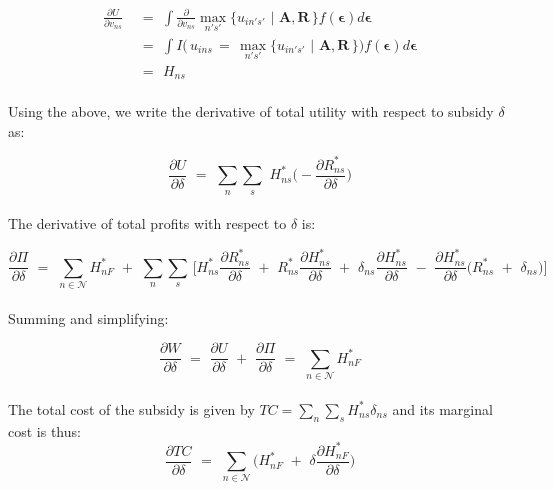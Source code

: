 \documentclass[12pt]{article}
\begin{document}
\begin{equation*}
\begin{aligned}
\frac{\partial U}{\partial v_{ns}} \,\, & =\,\, \int \frac{\partial }{\partial v_{ns}} \max_{n's'}\{u_{in' s'}\,\,|\,\, \bm{A},\bm{R}\,\}f(\bm{\epsilon}) d\bm{\epsilon} \\[.6em]
\,\, & =\,\, \int I\Big( \, u_{ins} \,=\, \max_{n's'}\{u_{in' s'} \,\,|\,\, \bm{A},\bm{R}\,\} \Big)f(\bm{\epsilon}) d\bm{\epsilon} \\[.6em]
\,\, & =\,\  H_{ns}
\end{aligned}
\end{equation*} \\[-1.99em]

 Using the above, we write the derivative of total utility with respect to subsidy $\delta$ as:

\begin{equation*}
\frac{\partial U}{\partial\delta} \,\,=\,\,  \sum_{n}\sum_{s}\,\, H^*_{ns}\Big(-\frac{\partial R_{ns}^*}{\partial \delta}\Big) 
\end{equation*} \\[-1.99em]

 The derivative of total profits with respect to $\delta$ is:

\begin{equation*}
\frac{\partial \Pi}{\partial\delta} \,\,=\,\, \sum_{n\in\mathcal{N}} H^*_{nF} \,\,+\,\, \sum_{n}\sum_{s}\, \Big[ H^*_{ns}\frac{\partial R^*_{ns}}{\partial \delta} \,\,+\,\, R^*_{ns}\frac{\partial H^*_{ns}}{\partial \delta} \,\,+\,\, \delta_{ns}\frac{\partial H^*_{ns}}{\partial \delta} \,\,-\,\, \frac{\partial H^*_{ns}}{\partial \delta}\big( R^*_{ns} \,\, + \,\, \delta_{ns} \big) \Big]
\end{equation*} \\[-1.99em]

 Summing and simplifying:

\begin{equation}
\frac{\partial W}{\partial\delta} \,\,=\,\, \frac{\partial U}{\partial\delta} \,\,+\,\, \frac{\partial \Pi}{\partial\delta} \,\,=\,\, \sum_{n\in\mathcal{N}} H^*_{nF}
\end{equation} \\[-1.99em]

 The total cost of the subsidy is given by $TC = \sum_n\sum_s H^*_{ns}\delta_{ns}$ and its marginal cost is thus:
\begin{equation*}
 \frac{\partial TC}{\partial \delta} \,\,=\,\, \sum_{n\in\mathcal{N}} \Big( H^*_{nF} \,\,+\,\, \delta\frac{\partial H^*_{nF}}{\partial \delta} \Big)
 \end{equation*} \\[-1.99em]
\end{document}
